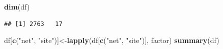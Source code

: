 \documentclass[
]{article}
\newenvironment{Shaded}{\begin{snugshade}}{\end{snugshade}}
\newcommand{\FunctionTok}[1]{\textcolor[rgb]{0.13,0.29,0.53}{\textbf{#1}}}
\newcommand{\NormalTok}[1]{#1}
\newcommand{\OtherTok}[1]{\textcolor[rgb]{0.56,0.35,0.01}{#1}}
\newcommand{\StringTok}[1]{\textcolor[rgb]{0.31,0.60,0.02}{#1}}
\begin{document}
\begin{Shaded}
\begin{Highlighting}[]
\FunctionTok{dim}\NormalTok{(df)}
\end{Highlighting}
\end{Shaded}

\begin{verbatim}
## [1] 2763   17
\end{verbatim}

\begin{Shaded}
\begin{Highlighting}[]
\NormalTok{df[}\FunctionTok{c}\NormalTok{(}\StringTok{"net"}\NormalTok{, }\StringTok{"site"}\NormalTok{)]}\OtherTok{\textless{}{-}}\FunctionTok{lapply}\NormalTok{(df[}\FunctionTok{c}\NormalTok{(}\StringTok{"net"}\NormalTok{, }\StringTok{"site"}\NormalTok{)], factor)}
\FunctionTok{summary}\NormalTok{(df)}
\end{Highlighting}
\end{Shaded}
\end{document}
